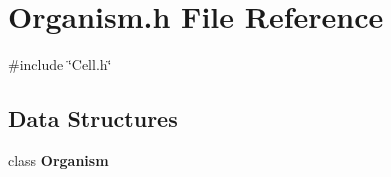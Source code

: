 \section{Organism.\+h File Reference}
\label{Organism_8h}
{\ttfamily \#include \char`\"{}Cell.\+h\char`\"{}}\newline
\subsection*{Data Structures}
\begin{DoxyCompactItemize}
\item 
class \textbf{ Organism}
\end{DoxyCompactItemize}
